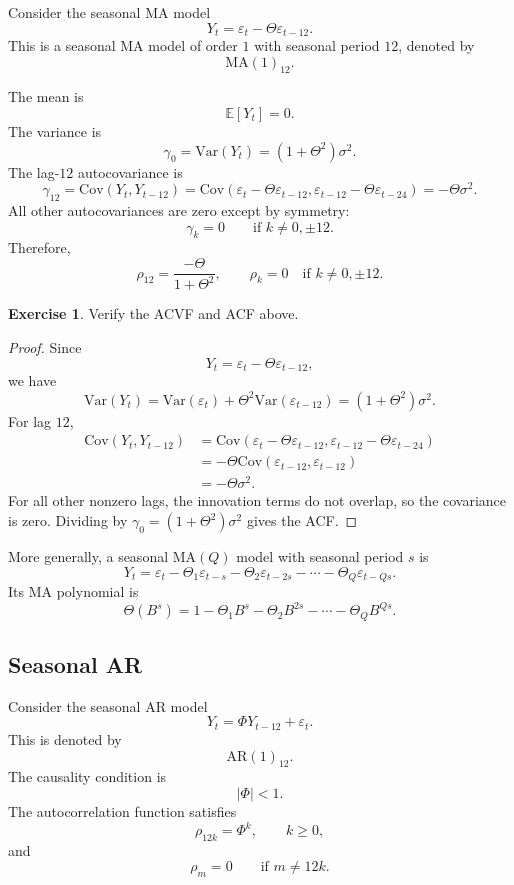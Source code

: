 \documentclass[12pt,oneside]{book}
\numberwithin{equation}{section}
\theoremstyle{definition}
\newtheorem{exercise}{Exercise}[section]
\theoremstyle{plain}
\theoremstyle{remark}
\newcommand{\E}{\mathbb{E}}
\newcommand{\Var}{\mathrm{Var}}
\newcommand{\Cov}{\mathrm{Cov}}
\begin{document}
Consider the seasonal MA model
\[
Y_t=\varepsilon_t-\Theta\varepsilon_{t-12}.
\]
This is a seasonal MA model of order $1$ with seasonal period $12$, denoted by
\[
\mathrm{MA}(1)_{12}.
\]

The mean is
\[
\E[Y_t]=0.
\]
The variance is
\[
\gamma_0
=
\Var(Y_t)
=
(1+\Theta^2)\sigma^2.
\]
The lag-$12$ autocovariance is
\[
\gamma_{12}
=
\Cov(Y_t,Y_{t-12})
=
\Cov(\varepsilon_t-\Theta\varepsilon_{t-12},
\varepsilon_{t-12}-\Theta\varepsilon_{t-24})
=
-\Theta\sigma^2.
\]
All other autocovariances are zero except by symmetry:
\[
\gamma_k=0
\qquad
\text{if } k\neq 0,\pm 12.
\]
Therefore,
\[
\rho_{12}
=
\frac{-\Theta}{1+\Theta^2},
\qquad
\rho_k=0
\quad
\text{if } k\neq 0,\pm 12.
\]

\begin{exercise}
Verify the ACVF and ACF above.
\end{exercise}

\begin{proof}
Since
\[
Y_t=\varepsilon_t-\Theta\varepsilon_{t-12},
\]
we have
\[
\Var(Y_t)
=
\Var(\varepsilon_t)+\Theta^2\Var(\varepsilon_{t-12})
=
(1+\Theta^2)\sigma^2.
\]
For lag $12$,
\begin{align*}
\Cov(Y_t,Y_{t-12})
&=
\Cov(\varepsilon_t-\Theta\varepsilon_{t-12},
\varepsilon_{t-12}-\Theta\varepsilon_{t-24}) \\
&=
-\Theta\Cov(\varepsilon_{t-12},\varepsilon_{t-12}) \\
&=
-\Theta\sigma^2.
\end{align*}
For all other nonzero lags, the innovation terms do not overlap, so the covariance is zero. Dividing by $\gamma_0=(1+\Theta^2)\sigma^2$ gives the ACF.
\end{proof}

More generally, a seasonal MA$(Q)$ model with seasonal period $s$ is
\[
Y_t
=
\varepsilon_t-\Theta_1\varepsilon_{t-s}
-\Theta_2\varepsilon_{t-2s}
-\cdots
-\Theta_Q\varepsilon_{t-Qs}.
\]
Its MA polynomial is
\[
\Theta(B^s)
=
1-\Theta_1B^s-\Theta_2B^{2s}-\cdots-\Theta_QB^{Qs}.
\]

\subsection{Seasonal AR}

Consider the seasonal AR model
\[
Y_t=\Phi Y_{t-12}+\varepsilon_t.
\]
This is denoted by
\[
\mathrm{AR}(1)_{12}.
\]
The causality condition is
\[
|\Phi|<1.
\]
The autocorrelation function satisfies
\[
\rho_{12k}=\Phi^k,
\qquad k\geq 0,
\]
and
\[
\rho_m=0
\qquad
\text{if } m \neq 12k.
\]
\end{document}
